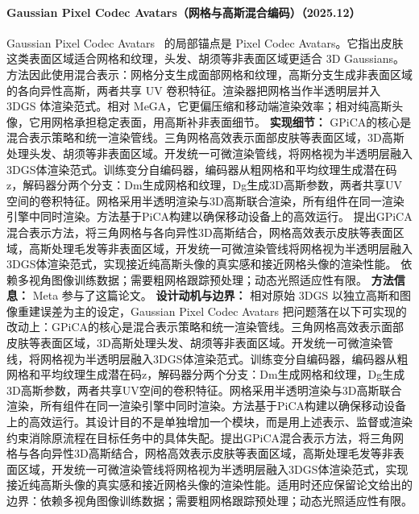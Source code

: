 \paragraph{Gaussian Pixel Codec Avatars（网格与高斯混合编码）（2025.12）}
Gaussian Pixel Codec Avatars~\cite{2512_15711} 的局部锚点是 Pixel Codec Avatars。它指出皮肤这类表面区域适合网格和纹理，头发、胡须等非表面区域更适合 3D Gaussians。方法因此使用混合表示：网格分支生成面部网格和纹理，高斯分支生成非表面区域的各向异性高斯，两者共享 UV 卷积特征。渲染器把网格当作半透明层并入 3DGS 体渲染范式。相对 MeGA，它更偏压缩和移动端渲染效率；相对纯高斯头像，它用网格承担稳定表面，用高斯补非表面细节。
\textbf{实现细节：} GPiCA的核心是混合表示策略和统一渲染管线。三角网格高效表示面部皮肤等表面区域，3D高斯处理头发、胡须等非表面区域。开发统一可微渲染管线，将网格视为半透明层融入3DGS体渲染范式。训练变分自编码器，编码器从粗网格和平均纹理生成潜在码z，解码器分两个分支：Dm生成网格和纹理，Dg生成3D高斯参数，两者共享UV空间的卷积特征。网格采用半透明渲染与3D高斯联合渲染，所有组件在同一渲染引擎中同时渲染。方法基于PiCA构建以确保移动设备上的高效运行。 提出GPiCA混合表示方法，将三角网格与各向异性3D高斯结合，网格高效表示皮肤等表面区域，高斯处理毛发等非表面区域，开发统一可微渲染管线将网格视为半透明层融入3DGS体渲染范式，实现接近纯高斯头像的真实感和接近网格头像的渲染性能。 依赖多视角图像训练数据；需要粗网格跟踪预处理；动态光照适应性有限。
\textbf{方法信息：} Meta 参与了这篇论文。
\textbf{设计动机与边界：} 相对原始 3DGS 以独立高斯和图像重建误差为主的设定，Gaussian Pixel Codec Avatars 把问题落在以下可实现的改动上：GPiCA的核心是混合表示策略和统一渲染管线。三角网格高效表示面部皮肤等表面区域，3D高斯处理头发、胡须等非表面区域。开发统一可微渲染管线，将网格视为半透明层融入3DGS体渲染范式。训练变分自编码器，编码器从粗网格和平均纹理生成潜在码z，解码器分两个分支：Dm生成网格和纹理，Dg生成3D高斯参数，两者共享UV空间的卷积特征。网格采用半透明渲染与3D高斯联合渲染，所有组件在同一渲染引擎中同时渲染。方法基于PiCA构建以确保移动设备上的高效运行。其设计目的不是单独增加一个模块，而是用上述表示、监督或渲染约束消除原流程在目标任务中的具体失配。提出GPiCA混合表示方法，将三角网格与各向异性3D高斯结合，网格高效表示皮肤等表面区域，高斯处理毛发等非表面区域，开发统一可微渲染管线将网格视为半透明层融入3DGS体渲染范式，实现接近纯高斯头像的真实感和接近网格头像的渲染性能。适用时还应保留论文给出的边界：依赖多视角图像训练数据；需要粗网格跟踪预处理；动态光照适应性有限。
